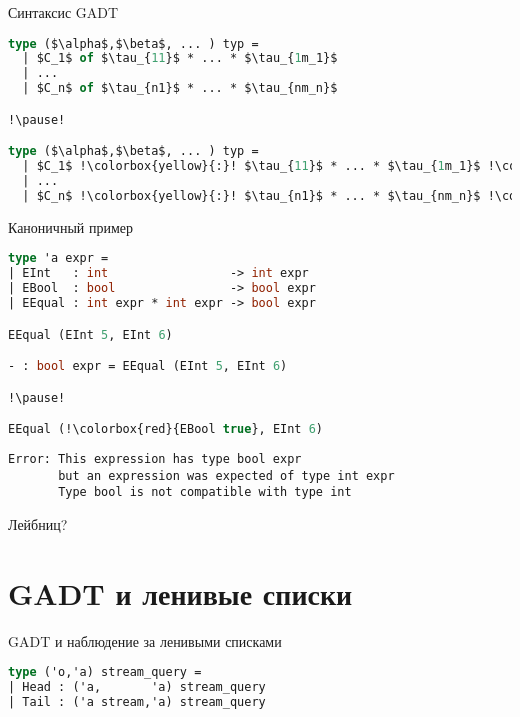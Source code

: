 \documentclass[10pt, mathserif]{beamer}
\theoremstyle{definition}
\begin{document}
\begin{frame}[fragile]{Синтаксис GADT}
\begin{lstlisting}[language=ocaml,mathescape=true]
type ($\alpha$,$\beta$, ... ) typ =
  | $C_1$ of $\tau_{11}$ * ... * $\tau_{1m_1}$
  | ...
  | $C_n$ of $\tau_{n1}$ * ... * $\tau_{nm_n}$

!\pause!

type ($\alpha$,$\beta$, ... ) typ =
  | $C_1$ !\colorbox{yellow}{:}! $\tau_{11}$ * ... * $\tau_{1m_1}$ !\colorbox{yellow}{$\rightarrow$ ($t_{11}$, $t_{12}$, ...) typ}!
  | ...
  | $C_n$ !\colorbox{yellow}{:}! $\tau_{n1}$ * ... * $\tau_{nm_n}$ !\colorbox{yellow}{$\rightarrow$ ($t_{n1}$, $t_{n2}$, ...) typ}!
\end{lstlisting}

\end{frame}

\begin{frame}[fragile]{Каноничный пример}
\begin{lstlisting}[language=ocaml,mathescape=true]
type 'a expr =
| EInt   : int                 -> int expr
| EBool  : bool                -> bool expr
| EEqual : int expr * int expr -> bool expr

EEqual (EInt 5, EInt 6)

- : bool expr = EEqual (EInt 5, EInt 6)

!\pause!

EEqual (!\colorbox{red}{EBool true}, EInt 6)
\end{lstlisting}

\begin{verbatim}
Error: This expression has type bool expr
       but an expression was expected of type int expr
       Type bool is not compatible with type int
\end{verbatim}
\end{frame}

\begin{frame}{Лейбниц?}
 
\end{frame}

\section{GADT и ленивые списки}

\begin{frame}[fragile]{GADT и наблюдение за ленивыми списками}
\begin{lstlisting}[language=ocaml,mathescape=true]
type ('o,'a) stream_query =
| Head : ('a,       'a) stream_query
| Tail : ('a stream,'a) stream_query
\end{lstlisting}
\end{frame}
\end{document}
